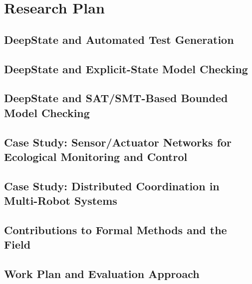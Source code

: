 \section{Research Plan}

%

\subsection{DeepState and Automated Test Generation}
\label{sec:framac2deepstate}


\subsection{DeepState and Explicit-State Model Checking}


\subsection{DeepState and SAT/SMT-Based Bounded Model Checking}


\subsection{Case Study: Sensor/Actuator Networks for Ecological Monitoring and Control}
\label{sec:case-study}


\subsection{Case Study: Distributed Coordination in Multi-Robot Systems}
\label{sec:case-study-robots}


\subsection{Contributions to Formal Methods and the Field}
\label{sec:contributions}


\subsection{Work Plan and Evaluation Approach}
\label{sec:workplan}

